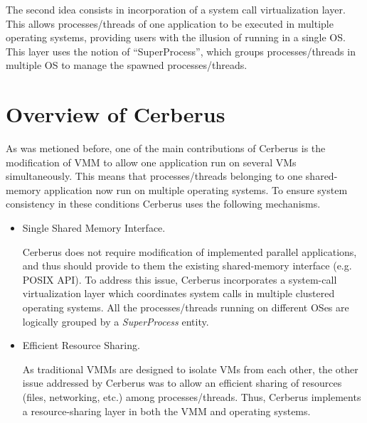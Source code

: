 \documentclass[journal]{IEEEtran}
\begin{document}
The second idea consists in incorporation of a system call
virtualization layer. This allows processes/threads of one application
to be executed in multiple operating systems, providing users with the
illusion of running in a single OS. This layer uses the notion of
``SuperProcess'', which groups processes/threads in multiple OS to
manage the spawned processes/threads.

\section{Overview of Cerberus}

As was metioned before, one of the main contributions of Cerberus is the
modification of VMM to allow one application run on several VMs
simultaneously. This means that processes/threads belonging to one
shared-memory application now run on multiple operating systems. To
ensure system consistency in these conditions Cerberus uses the
following mechanisms.

\begin{itemize}
  \item Single Shared Memory Interface.

    Cerberus does not require modification of implemented parallel
    applications, and thus should provide to them the existing
    shared-memory interface (e.g. POSIX API). To address this issue,
    Cerberus incorporates a system-call virtualization layer which
    coordinates system calls in multiple clustered operating systems.
    All the processes/threads running on different OSes are logically
    grouped by a \emph{SuperProcess} entity.

  \item Efficient Resource Sharing.

   As traditional VMMs are designed to isolate VMs from each other, the
   other issue addressed by Cerberus was to allow an efficient sharing
   of resources (files, networking, etc.) among processes/threads. Thus,
   Cerberus implements a resource-sharing layer in both the VMM and
   operating systems.

\end{itemize}
\end{document}
